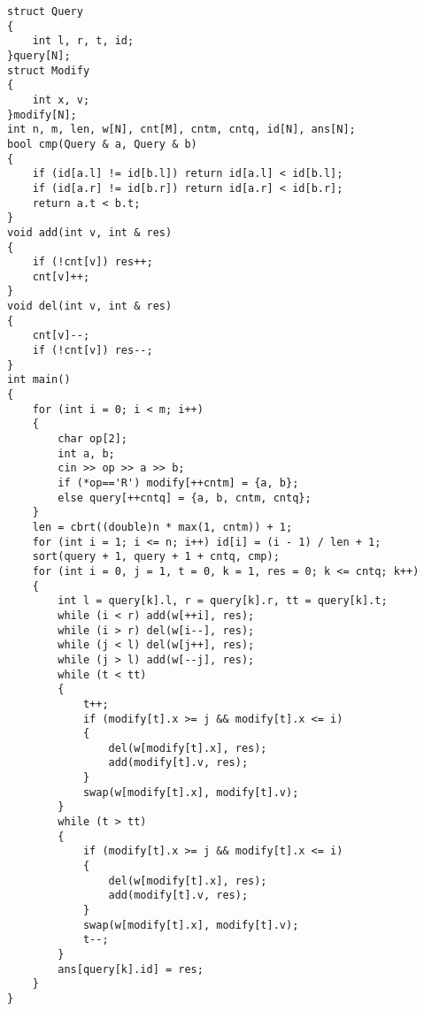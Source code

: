 \documentclass[a4paper, fontset=none]{ctexart}
\begin{document}
\begin{verbatim}
struct Query
{
    int l, r, t, id;
}query[N];
struct Modify
{
    int x, v;
}modify[N];
int n, m, len, w[N], cnt[M], cntm, cntq, id[N], ans[N];
bool cmp(Query & a, Query & b)
{
    if (id[a.l] != id[b.l]) return id[a.l] < id[b.l];
    if (id[a.r] != id[b.r]) return id[a.r] < id[b.r];
    return a.t < b.t;
}
void add(int v, int & res)
{
    if (!cnt[v]) res++;
    cnt[v]++;
}
void del(int v, int & res)
{
    cnt[v]--;
    if (!cnt[v]) res--;
}
int main()
{
    for (int i = 0; i < m; i++)
    {
        char op[2];
        int a, b;
        cin >> op >> a >> b;
        if (*op=='R') modify[++cntm] = {a, b};
        else query[++cntq] = {a, b, cntm, cntq};
    }
    len = cbrt((double)n * max(1, cntm)) + 1;
    for (int i = 1; i <= n; i++) id[i] = (i - 1) / len + 1;
    sort(query + 1, query + 1 + cntq, cmp);
    for (int i = 0, j = 1, t = 0, k = 1, res = 0; k <= cntq; k++)
    {
        int l = query[k].l, r = query[k].r, tt = query[k].t;
        while (i < r) add(w[++i], res);
        while (i > r) del(w[i--], res);
        while (j < l) del(w[j++], res);
        while (j > l) add(w[--j], res);
        while (t < tt)
        {
            t++;
            if (modify[t].x >= j && modify[t].x <= i)
            {
                del(w[modify[t].x], res);
                add(modify[t].v, res);
            }
            swap(w[modify[t].x], modify[t].v);
        }
        while (t > tt)
        {
            if (modify[t].x >= j && modify[t].x <= i)
            {
                del(w[modify[t].x], res);
                add(modify[t].v, res);
            }
            swap(w[modify[t].x], modify[t].v);
            t--;
        }
        ans[query[k].id] = res;
    }
}
\end{verbatim}
\end{document}
